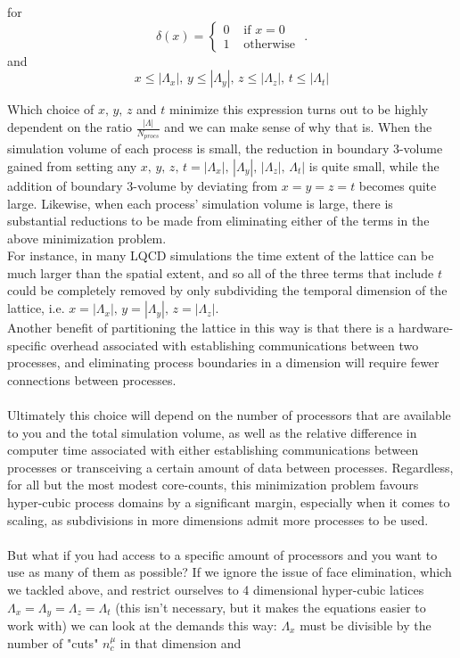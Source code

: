\documentclass[a4paper,10pt]{book}
\begin{document}
for 
\begin{equation*}
\delta(x) = \begin{cases}0 & \text { if }x=0 \\ 1 & \text { otherwise }\end{cases}.
\end{equation*}
and 
\begin{equation*}
x\leq|\Lambda_x|,\,y\leq|\Lambda_y|,\,z\leq|\Lambda_z|,\,t\leq|\Lambda_t|
\end{equation*}

Which choice of $x,\,y,\,z$ and $t$ minimize this expression turns out to be highly dependent on the ratio $\frac{|\Lambda|}{N_{procs}}$ and we can make sense of why that is. When the simulation volume of each process is small, the reduction in boundary 3-volume gained from setting any $x,\,y,\,z,\,t = |\Lambda_x|,\,|\Lambda_y|,\,|\Lambda_z|,\,\Lambda_t|$ is quite small, while the addition of boundary 3-volume by deviating from $x=y=z=t$ becomes quite large. Likewise, when each process' simulation volume is large, there is substantial reductions to be made from eliminating either of the terms in the above minimization problem.\\For instance, in many LQCD simulations the time extent of the lattice can be much larger than the spatial extent, and so all of the three terms that include $t$ could be completely removed by only subdividing the temporal dimension of the lattice, i.e. $x=|\Lambda_x|,\,y=|\Lambda_y|,\,z=|\Lambda_z|$.\\Another benefit of partitioning the lattice in this way is that there is a hardware-specific overhead associated with establishing communications between two processes, and eliminating process boundaries in a dimension will require fewer connections between processes.\\\\Ultimately this choice will depend on the number of processors that are available to you and the total simulation volume, as well as the relative difference in computer time associated with either establishing communications between processes or transceiving a certain amount of data between processes. Regardless, for all but the most modest core-counts, this minimization problem favours hyper-cubic process domains by a significant margin, especially when it comes to scaling, as subdivisions in more dimensions admit more processes to be used.\\\\But what if you had access to a specific amount of processors and you want to use as many of them as possible? If we ignore the issue of face elimination, which we tackled above, and restrict ourselves to 4 dimensional hyper-cubic latices $\Lambda_x=\Lambda_y=\Lambda_z=\Lambda_t$ (this isn't necessary, but it makes the equations easier to work with) we can look at the demands this way: $\Lambda_x$ must be divisible by the number of "cuts" $n^\mu_c$ in that dimension and 
\end{document}
